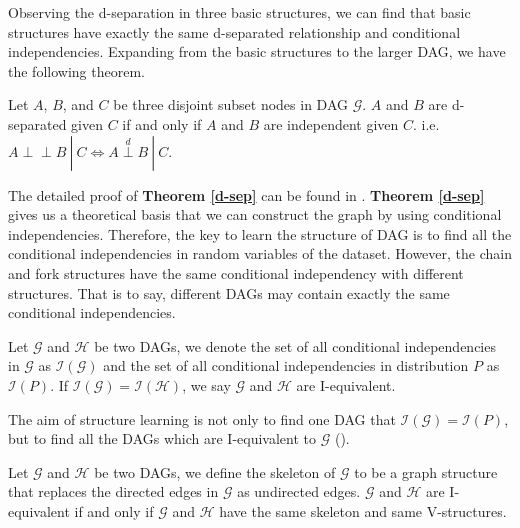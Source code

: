 \documentclass[twoside,11pt]{article}
\begin{document}
Observing the d-separation in three basic structures, we can find that basic structures have exactly the same d-separated relationship and conditional independencies. Expanding from the basic structures to the larger DAG, we have the following theorem.
\begin{theorem}
\label{d-sep}
Let $A$, $B$, and $C$ be three disjoint subset nodes in DAG $\mathcal G$. $A$ and $B$ are d-separated given $C$ if and only if $A$ and $B$ are independent given $C$. i.e. $A\perp\!\!\!\perp B\ |\ C \Longleftrightarrow A\overset{d}{\perp} B\ |\ C$.
\end{theorem}
The detailed proof of \textbf{Theorem \ref{d-sep}} can be found in \cite{pearl1988probabilistic}. \textbf{Theorem \ref{d-sep}} gives us a theoretical basis that we can construct the graph by using conditional independencies. Therefore, the key to learn the structure of DAG is to find all the conditional independencies in random variables of the dataset. However, the chain and fork structures have the same conditional independency with different structures. That is to say, different DAGs may contain exactly the same conditional independencies.

\begin{definition}
\label{I-equivalent}
Let $\mathcal G$ and $\mathcal H$ be two DAGs, we denote the set of all conditional independencies in $\mathcal G$ as $\mathcal I(\mathcal G)$ and the set of all conditional independencies in distribution $P$ as $\mathcal I(P)$. If $\mathcal I(\mathcal G)=\mathcal I(\mathcal H)$, we say $\mathcal G$ and $\mathcal H$ are I-equivalent.
\end{definition}

The aim of structure learning is not only to find one DAG that $\mathcal I(\mathcal G)=\mathcal I(P)$, but to find all the DAGs which are I-equivalent to $\mathcal G$ (\cite{koller2009probabilistic}).

\begin{theorem}
\label{equivalent}
Let $\mathcal G$ and $\mathcal H$ be two DAGs, we define the skeleton of $\mathcal G$ to be a graph structure that replaces the directed edges in $\mathcal G$ as undirected edges. $\mathcal G$ and $\mathcal H$ are I-equivalent if and only if $\mathcal G$ and $\mathcal H$ have the same skeleton and same V-structures.
\end{theorem}
\end{document}
